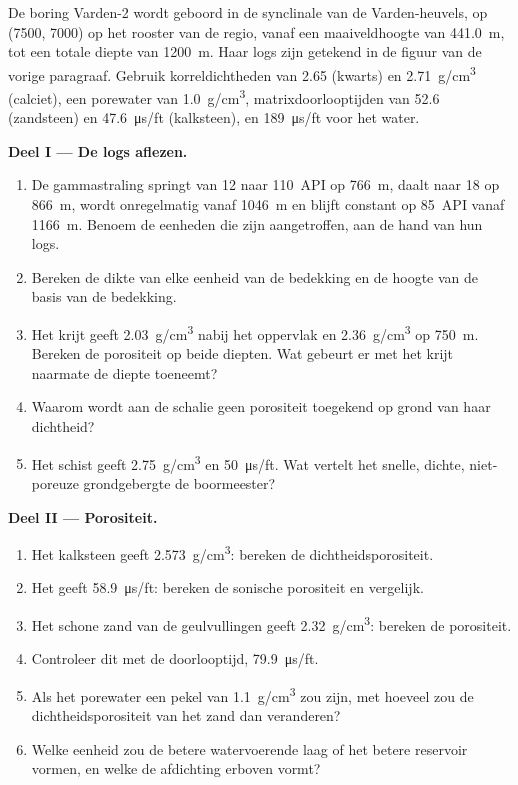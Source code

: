 \begin{problem}
\label{pb:b3:facies-models:1}
De boring Varden-2 wordt geboord in de synclinale van de Varden-heuvels, op
(7500, 7000) op het rooster van de regio, vanaf een maaiveldhoogte van
\qty{441.0}{m}, tot een totale diepte van \qty{1200}{m}. Haar logs zijn getekend in de
figuur van de vorige paragraaf. Gebruik korreldichtheden van 2.65 (kwarts) en
\qty{2.71}{g/cm^3} (calciet), een porewater van \qty{1.0}{g/cm^3}, matrixdoorlooptijden
van 52.6 (zandsteen) en \qty{47.6}{\micro\second/ft}
(kalksteen), en \qty{189}{\micro\second/ft} voor het water.

\medskip\noindent\textbf{Deel I --- De logs aflezen.}
\begin{enumerate}
\item De gammastraling springt van 12 naar \qty{110}{API} op \qty{766}{m}, daalt
  naar 18 op \qty{866}{m}, wordt onregelmatig vanaf \qty{1046}{m} en blijft constant op
  \qty{85}{API} vanaf \qty{1166}{m}. Benoem de eenheden die zijn aangetroffen, aan de hand van hun logs.
\item Bereken de dikte van elke eenheid van de bedekking en de hoogte van
  de basis van de bedekking.
\item Het krijt geeft \qty{2.03}{g/cm^3} nabij het oppervlak en
  \qty{2.36}{g/cm^3} op \qty{750}{m}. Bereken de porositeit op beide diepten.
  Wat gebeurt er met het krijt naarmate de diepte toeneemt?
\item Waarom wordt aan de schalie geen porositeit toegekend op grond van haar dichtheid?
\item Het schist geeft \qty{2.75}{g/cm^3} en \qty{50}{\micro\second/ft}.
  Wat vertelt het snelle, dichte, niet-poreuze grondgebergte de boormeester?
\end{enumerate}

\medskip\noindent\textbf{Deel II --- Porositeit.}
\begin{enumerate}[resume]
\item Het kalksteen geeft \qty{2.573}{g/cm^3}: bereken de dichtheidsporositeit.
\item Het geeft \qty{58.9}{\micro\second/ft}: bereken de sonische porositeit en
  vergelijk.
\item Het schone zand van de geulvullingen geeft \qty{2.32}{g/cm^3}: bereken
  de porositeit.
\item Controleer dit met de doorlooptijd, \qty{79.9}{\micro\second/ft}.
\item Als het porewater een pekel van \qty{1.1}{g/cm^3} zou zijn, met hoeveel zou
  de dichtheidsporositeit van het zand dan veranderen?
\item Welke eenheid zou de betere watervoerende laag of het betere reservoir vormen, en welke
  de afdichting erboven vormt?
\end{enumerate}


\end{problem}
